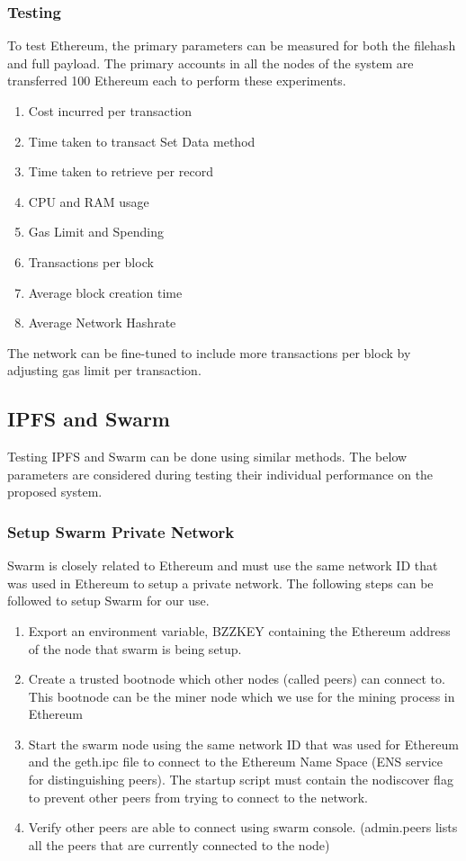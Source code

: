 \documentclass[11pt,openright]{report}
\begin{document}
\subsubsection{Testing}
To test Ethereum, the primary parameters can be measured for both the filehash and full payload. The primary accounts in all the nodes of the system are transferred 100 Ethereum each to perform these experiments. 
\begin{enumerate}
    \item Cost incurred per transaction
    \item Time taken to transact Set Data method
    \item Time taken to retrieve per record
    \item CPU and RAM usage
    \item Gas Limit and Spending
    \item Transactions per block
    \item Average block creation time
    \item Average Network Hashrate
\end{enumerate}
The network can be fine-tuned to include more transactions per block by adjusting gas limit per transaction.

\subsection{IPFS and Swarm}
Testing IPFS and Swarm can be done using similar methods. The below parameters are considered during testing their individual performance on the proposed system. 

\subsubsection{Setup Swarm Private Network}
Swarm is closely related to Ethereum and must use the same network ID that was used in Ethereum to setup a private network.
The following steps can be followed to setup Swarm for our use.
\begin{enumerate}
    \item Export an environment variable, BZZKEY containing the Ethereum address of the node that swarm is being setup.
    \item Create a trusted bootnode which other nodes (called peers) can connect to. This bootnode can be the miner node which we use for the mining process in Ethereum
    \item Start the swarm node using the same network ID that was used for Ethereum and the geth.ipc file to connect to the Ethereum Name Space (ENS service for distinguishing peers). The startup script must contain the nodiscover flag to prevent other peers from trying to connect to the network.
    \item Verify other peers are able to connect using swarm console. (admin.peers lists all the peers that are currently connected to the node)
\end{enumerate}
\end{document}
